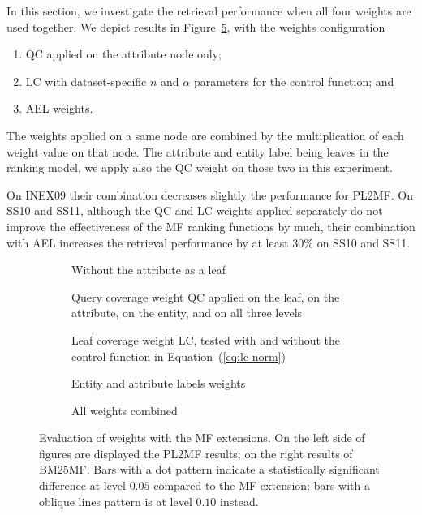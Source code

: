 In this section, we investigate the retrieval performance when all four weights are used together. We depict results in Figure~\ref{fig:mf-all}, with the weights configuration
\begin{enumerate}
    \item QC applied on the attribute node only;
    \item LC with dataset-specific $n$ and $\alpha$ parameters for the control function; and
    \item AEL weights.
\end{enumerate}

The weights applied on a same node are combined by the multiplication of each weight value on that node.
The attribute and entity label being leaves in the ranking model, we apply also the QC weight on those two in this experiment.

On INEX09 their combination decreases slightly the performance for PL2MF. On SS10 and SS11, although the QC and LC weights applied separately do not improve the effectiveness of the MF ranking functions by much, their combination with AEL increases the retrieval performance by at least $30\%$ on SS10 and SS11.

\begin{figure}
	\centering
	\begin{subfigure}{.483\textwidth}
		\centering
		\resizebox{\textwidth}{!}{
			
		}
		\caption{Without the attribute as a leaf}
		\label{fig:mf-att}
	\end{subfigure}
	\quad
	\begin{subfigure}{.483\textwidth}
		\centering
		\resizebox{\textwidth}{!}{
			
		}
		\caption{Query coverage weight QC applied on the leaf, on the attribute, on the entity, and on all three levels}
		\label{fig:mf-qc}
	\end{subfigure}
	\qquad
	\begin{subfigure}{.483\textwidth}
		\centering
		\resizebox{\textwidth}{!}{
			
		}
		\caption{Leaf coverage weight LC, tested with and without the control function in Equation~(\ref{eq:lc-norm})}
		\label{fig:mf-lc}
	\end{subfigure}
	\quad
	\begin{subfigure}{.483\textwidth}
		\centering
		\resizebox{\textwidth}{!}{
			
		}
		\caption{Entity and attribute labels weights}
		\label{fig:mf-ael}
	\end{subfigure}
	\qquad
	\begin{subfigure}{.8\textwidth}
		\centering
		\resizebox{\textwidth}{!}{
			
		}
		\caption{All weights combined}
		\label{fig:mf-all}
	\end{subfigure}
	\caption{Evaluation of weights with the MF extensions. On the left side of figures are displayed the PL2MF results; on the right results of BM25MF. Bars with a dot pattern indicate a statistically significant difference at level $0.05$ compared to the MF extension; bars with a oblique lines pattern is at level $0.10$ instead.}
	\label{fig:mf-weights}
\end{figure}

